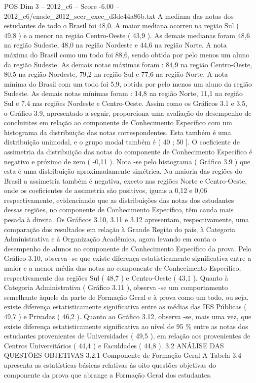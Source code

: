 \begin{textsample}{POS Dim 3 – 2012\_c6 – Score -6.00 – 2012\_c6/enade\_2012\_secr\_exec\_d3dc44a86b.txt}
A mediana das notas dos estudantes de todo o Brasil foi 48,0.
A maior mediana ocorreu na região Sul ( 49,8 ) e a menor na região Centro-Oeste ( 43,9 ).
As demais medianas foram 48,6 na região Sudeste, 48,0 na região Nordeste e 44,6 na região Norte.
A nota máxima do Brasil como um todo foi 88,6, sendo obtida por pelo menos um aluno da região Sudeste.
As demais notas máximas foram : 84,9 na região Centro-Oeste, 80,5 na região Nordeste, 79,2 na região Sul e 77,6 na região Norte.
A nota mínima do Brasil com um todo foi 5,9, obtida por pelo menos um aluno da região Sudeste.
As demais notas mínimas foram : 14,8 na região Norte, 11,1 na região Sul e 7,4 nas regiões Nordeste e Centro-Oeste.
Assim como os Gráficos 3.1 e 3.5, o Gráfico 3.9, apresentado a seguir, proporciona uma avaliação do desempenho de concluintes em relação ao componente de Conhecimento Específico com um histograma da distribuição das notas correspondentes.
Esta também é uma distribuição unimodal, e o grupo modal também é ( 40 ; 50 ].
O coeficiente de assimetria da distribuição das notas do componente de Conhecimento Específico é negativo e próximo de zero ( -0,11 ).
Nota -se pelo histograma ( Gráfico 3.9 ) que esta é uma distribuição aproximadamente simétrica.
Na maioria das regiões do Brasil a assimetria também é negativa, exceto nas regiões Norte e Centro-Oeste, onde os coeficientes de assimetria são positivos, iguais a 0,12 e 0,06 respectivamente, evidenciando que as distribuições das notas dos estudantes dessas regiões, no componente de Conhecimento Específico, têm cauda mais pesada à direita.
Os Gráficos 3.10, 3.11 e 3.12 apresentam, respectivamente, uma comparação dos resultados em relação à Grande Região do país, à Categoria Administrativa e à Organização Acadêmica, agora levando em conta o desempenho de alunos no componente de Conhecimento Específico da prova.
Pelo Gráfico 3.10, observa -se que existe diferença estatisticamente significativa entre a maior e a menor média das notas no componente de Conhecimento Específico, respectivamente das regiões Sul ( 48,7 ) e Centro-Oeste ( 43,1 ).
Quanto à Categoria Administrativa ( Gráfico 3.11 ), observa -se um comportamento semelhante àquele da parte de Formação Geral e à prova como um todo, ou seja, existe diferença estatisticamente significativa entre as médias das IES Públicas ( 49,7 ) e Privadas ( 46,2 ).
Quanto ao Gráfico 3.12, observa -se, mais uma vez, que existe diferença estatisticamente significativa ao nível de 95 \% entre as notas dos estudantes provenientes de Universidades ( 49,5 ), em relação aos provenientes de Centros Universitários ( 44,4 ) e Faculdades ( 44,8 ). 3.2 ANÁLISE DAS QUESTÕES OBJETIVAS 3.2.1 Componente de Formação Geral A Tabela 3.4 apresenta as estatísticas básicas relativas às oito questões objetivas do componente da prova que abrange a Formação Geral dos estudantes.

\end{textsample}
